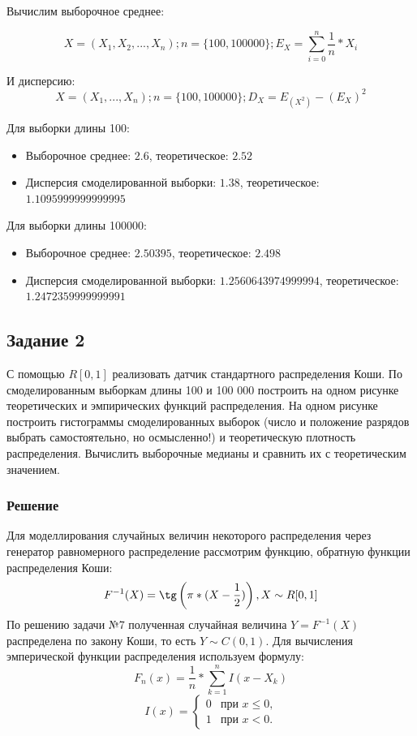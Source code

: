 \documentclass{article}
\begin{document}
Вычислим выборочное среднее:

    \[X = (X_1, X_2, ..., X_n); n = \{100, 100000\}; 
    E_X = \sum_{i = 0}^{n}\frac{1}{n} * X_i\]

И дисперсию:
    \[X = (X_1, ..., X_n); n = \{100, 100000\};
    D_X = E_(X^2) - (E_X)^2\]

Для выборки длины 100:
\begin{itemize}
    \item Выборочное среднее: $2.6$, теоретическое: $2.52$
    \item Дисперсия смоделированной выборки: $1.38$, теоретическое: $1.1095999999999995$
\end{itemize}

Для выборки длины 100000:
\begin{itemize}
    \item Выборочное среднее: $2.50395$, теоретическое: $2.498$
    \item Дисперсия смоделированной выборки: $1.2560643974999994$, теоретическое: $1.2472359999999991$
\end{itemize}

\subsection{Задание 2}
С помощью $R[0,1]$ реализовать датчик стандартного распределения Коши. По смоделированным выборкам длины 100 и 100 000 построить на одном рисунке теоретических и эмпирических функций распределения. На одном рисунке построить гистограммы смоделированных выборок (число и положение разрядов выбрать самостоятельно, но осмысленно!) и теоретическую плотность распределения. Вычислить выборочные медианы и сравнить их с теоретическим значением.

\subsubsection{Решение}
Для моделлирования случайных величин некоторого распределения через генератор 
равномерного распределение рассмотрим функцию, обратную функции распределения Коши: 
\[ F^{-1}(X) = \tg\left({\pi*(X-\frac{1}{2})}\right), X \sim R[0,1]\]
По решению задачи №7 полученная случайная величина $Y = F^{-1}(X)$ распределена 
по закону Коши, то есть $Y \sim C(0, 1)$. Для вычисления эмперической функции
распределения используем формулу:
\[F_n(x) = \frac{1}{n}*\sum_{k=1}^{n}I(x-X_k)\]
\begin{equation*}
    I(x)=
    \begin{cases}
        0 &\text{при $x \le 0$,}\\
        1 &\text{при $x < 0$.}
    \end{cases}
\end{equation*}
\end{document}
